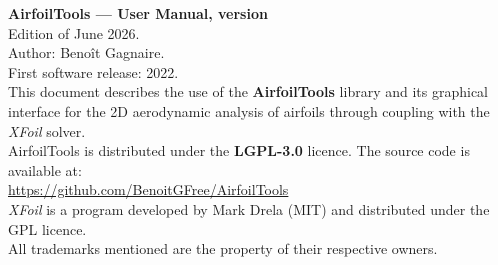 \documentclass[11pt,a4paper,oneside]{report}
\newcommand{\manueldate}{June 2026}
\newcommand{\manuelauteur}{Beno\^{i}t Gagnaire}
\newcommand{\manuelpremieredition}{2022}
\begin{document}
\thispagestyle{empty}
\null
\vfill
\begin{flushleft}
    \small
    \textbf{AirfoilTools --- User Manual, version \manuelversion}\\
    Edition of \manueldate.\\[0.5em]
    Author: \manuelauteur.\\
    First software release: \manuelpremieredition.\\[1em]

    This document describes the use of the \textbf{AirfoilTools}
    library and its graphical interface for the 2D aerodynamic
    analysis of airfoils through coupling with the \emph{XFoil}
    solver.\\[0.5em]

    AirfoilTools is distributed under the \textbf{LGPL-3.0} licence.
    The source code is available at:\\
    \url{https://github.com/BenoitGFree/AirfoilTools}\\[0.5em]

    \emph{XFoil} is a program developed by Mark Drela (MIT) and
    distributed under the GPL licence.\\[0.5em]

    All trademarks mentioned are the property of their respective
    owners.
\end{flushleft}
\clearpage

\tableofcontents
\clearpage
\listoffigures
\clearpage











\end{document}
